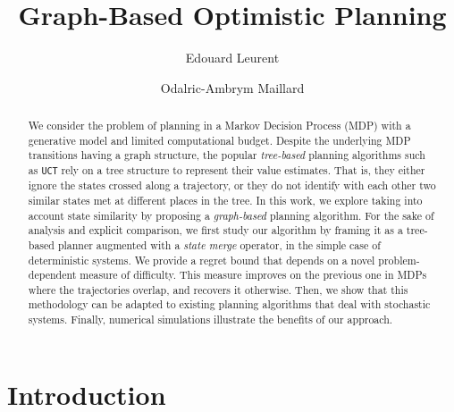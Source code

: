 \documentclass[runningheads]{llncs}
\begin{document}
\title{Graph-Based Optimistic Planning}
%
%
\author{Edouard Leurent\and Odalric-Ambrym Maillard}
%
%
%
\maketitle              %
%
\begin{abstract}
	We consider the problem of planning in a Markov Decision Process (MDP) with a generative model and limited computational budget. Despite the underlying MDP transitions having a graph structure, the popular \emph{tree-based} planning algorithms such as \texttt{UCT} rely on a tree structure to represent their value estimates. That is, they either ignore the states crossed along a trajectory, or they do not identify with each other two similar states met at different places in the tree. In this work, we explore taking into account state similarity by proposing a \emph{graph-based} planning algorithm. For the sake of analysis and explicit comparison, we first study our algorithm by framing it as a tree-based planner augmented with a \emph{state merge} operator, in the simple case of deterministic systems. We provide a regret bound that depends on a novel problem-dependent measure of difficulty. This measure improves on the previous one in MDPs where the trajectories overlap, and recovers it otherwise. Then, we show that this methodology can be adapted to existing planning algorithms that deal with stochastic systems. Finally, numerical simulations illustrate the benefits of our approach.
	
\end{abstract}
%
%
%

\section{Introduction}
\end{document}
